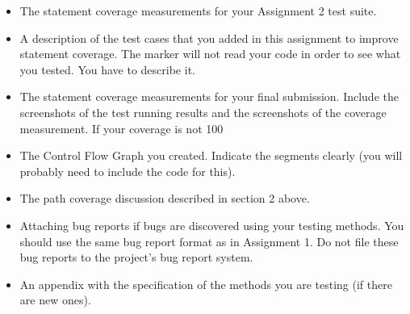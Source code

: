 \documentclass[fontsize=12pt,paper=letter,twoside]{scrartcl}
\begin{document}
\begin{itemize}
\item The statement coverage measurements for your Assignment 2 test suite.
\item A description of the test cases that you added in this assignment to improve statement
coverage. The marker will not read your code in order to see what you tested. You have to
describe it.
\item The statement coverage measurements for your final submission. Include the screenshots of
the test running results and the screenshots of the coverage measurement. If your coverage is
not 100%
\item The Control Flow Graph you created. Indicate the segments clearly (you will probably need
to include the code for this).
\item The path coverage discussion described in section 2 above.
\item Attaching bug reports if bugs are discovered using your testing methods. You should use the
same bug report format as in Assignment 1. Do not file these bug reports to the project’s bug
report system.
\item An appendix with the specification of the methods you are testing (if there are new ones). 
\end{itemize}
\end{document}
